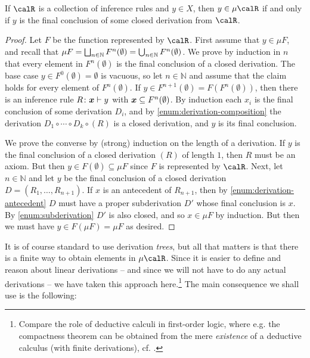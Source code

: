 \documentclass[a4paper, 11pt, article, danish, oneside]{memoir}
\newcommand{\naturals}{\mathbb{N}}
\DeclareMathOperator*{\smallbigsqcup}{\textstyle\bigsqcup}
\DeclareMathOperator*{\bigdjoin}{\mathchoice
    {\smallbigsqcup}%
    {\bigsqcup}%
    {\bigsqcup}%
    {\bigsqcup}%
}
\DeclareMathOperator*{\smallbigcup}{\textstyle\bigcup}
\DeclareMathOperator*{\bigunion}{\mathchoice
    {\smallbigcup}%
    {\bigcup}%
    {\bigcup}%
    {\bigcup}%
}
\begin{document}
\begin{proposition}
    \label{prop:fixpoint-iff-derivation}
    If $\calR$ is a collection of inference rules and $y \in X$, then $y \in \mu \calR$ if and only if $y$ is the final conclusion of some closed derivation from $\calR$.
\end{proposition}

\begin{proof}
    Let $F$ be the function represented by $\calR$. First assume that $y \in \mu F$, and recall that $\mu F = \bigdjoin_{n \in \naturals} F^n(\emptyset) = \bigunion_{n \in \naturals} F^n(\emptyset)$. We prove by induction in $n$ that every element in $F^n(\emptyset)$ is the final conclusion of a closed derivation. The base case $y \in F^0(\emptyset) = \emptyset$ is vacuous, so let $n \in \naturals$ and assume that the claim holds for every element of $F^n(\emptyset)$. If $y \in F^{n+1}(\emptyset) = F(F^n(\emptyset))$, then there is an inference rule $\myinfrule{R}{\seq{x}}{y}$ with $\bm{x} \subseteq F^n(\emptyset)$. By induction each $x_i$ is the final conclusion of some derivation $D_i$, and by \cref{enum:derivation-composition} the derivation $D_1 \circ \cdots \circ D_k \circ (R)$ is a closed derivation, and $y$ is its final conclusion.

    We prove the converse by (strong) induction on the length of a derivation. If $y$ is the final conclusion of a closed derivation $(R)$ of length $1$, then $R$ must be an axiom. But then $y \in F(\emptyset) \subseteq \mu F$ since $F$ is represented by $\calR$. Next, let $n \in \naturals$ and let $y$ be the final conclusion of a closed derivation $D = (R_1, \ldots, R_{n+1})$. If $x$ is an antecedent of $R_{n+1}$, then by \cref{enum:derivation-antecedent} $D$ must have a proper subderivation $D'$ whose final conclusion is $x$. By \cref{enum:subderivation} $D'$ is also closed, and so $x \in \mu F$ by induction. But then we must have $y \in F(\mu F) = \mu F$ as desired.
\end{proof}
%
It is of course standard to use derivation \emph{trees}, but all that matters is that there is a finite way to obtain elements in $\mu \calR$. Since it is easier to define and reason about linear derivations -- and since we will not have to do any actual derivations -- we have taken this approach here.\footnote{Compare the role of deductive calculi in first-order logic, where e.g. the compactness theorem can be obtained from the mere \emph{existence} of a deductive calculus (with finite derivations), cf. \textcite[Theorem~3.3.1]{leary-kristiansen-logic}.} The main consequence we shall use is the following:
\end{document}

